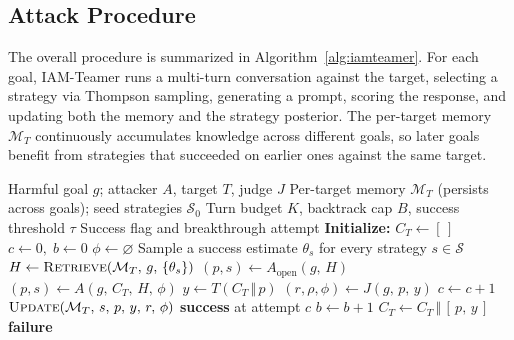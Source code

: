 \documentclass[a4paper,fleqn]{cas-sc}
\begin{document}
\subsection{Attack Procedure}
\label{sec:procedure}

The overall procedure is summarized in Algorithm~\ref{alg:iamteamer}.
For each goal, IAM-Teamer runs a multi-turn conversation against the target, selecting a strategy via Thompson sampling, generating a prompt, scoring the response, and updating both the memory and the strategy posterior.
The per-target memory $\mathcal{M}_T$ continuously accumulates knowledge across different goals, so later goals benefit from strategies that succeeded on earlier ones against the same target.

\begin{algorithm}[t]
  \caption{IAM-Teamer}
  \label{alg:iamteamer}
  \footnotesize
  \begin{algorithmic}[1]
    \Require Harmful goal $g$; attacker $A$, target $T$, judge $J$
    \Require Per-target memory $\mathcal{M}_T$ (persists across goals); seed strategies $\mathcal{S}_0$
    \Require Turn budget $K$, backtrack cap $B$, success threshold $\tau$
    \Ensure Success flag and breakthrough attempt
    \State
    \State \textbf{Initialize:}
    \State \quad $C_T \gets [\,]$ 
    \State \quad $c \gets 0,\; b \gets 0$ 
    \State \quad $\phi \gets \varnothing$ 
    \State
    \State Sample a success estimate $\theta_s$ for every strategy $s \in \mathcal{S}$ 
    \State $H \gets \textsc{Retrieve}(\mathcal{M}_T,\, g,\, \{\theta_s\})$ 
    \State $(p, s) \gets A_{\mathrm{open}}(g,\, H)$ 
    \Else
    \State $(p, s) \gets A(g,\, C_T,\, H,\, \phi)$ 
    \EndIf
    \State $y \gets T(C_T \,\Vert\, p)$ 
    \State $(r, \rho, \phi) \gets J(g,\, p,\, y)$ 
    \State $c \gets c + 1$
    \State $\textsc{Update}(\mathcal{M}_T,\, s,\, p,\, y,\, r,\, \phi)$ 
    \State \Return \textbf{success} at attempt $c$
    \State $b \gets b + 1$ 
    \Else
    \State $C_T \gets C_T \,\Vert\, [\,p,\, y\,]$ 
    \EndIf
    \EndWhile
    \State \Return \textbf{failure}
  \end{algorithmic}
\end{algorithm}
\end{document}
